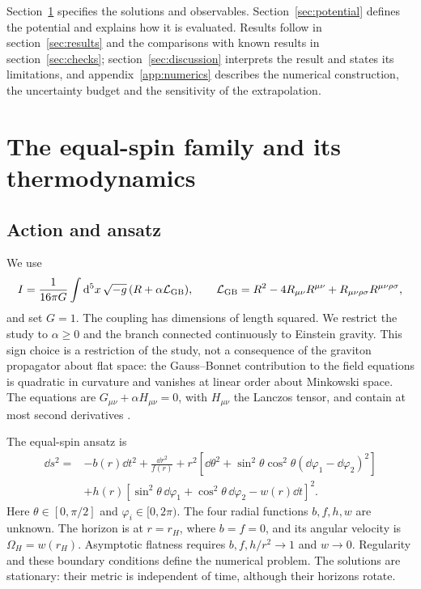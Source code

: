 \documentclass[11pt,a4paper]{article}
\begin{document}
Section~\ref{sec:setup} specifies the solutions and observables.
Section~\ref{sec:potential} defines the potential and explains how it is
evaluated. Results follow in section~\ref{sec:results} and the comparisons with
known results in section~\ref{sec:checks}; section~\ref{sec:discussion}
interprets the result and states its limitations, and
appendix~\ref{app:numerics} describes the numerical construction, the
uncertainty budget and the sensitivity of the extrapolation.

\section{The equal-spin family and its thermodynamics}
\label{sec:setup}

\subsection{Action and ansatz}

We use
\begin{equation}
 I=\frac1{16\pi G}\int\mathrm{d}^5x\,\sqrt{-g}\,
 (R+\alpha\mathcal L_{\mathrm{GB}}),\qquad
 \mathcal L_{\mathrm{GB}}=R^2-4R_{\mu\nu}R^{\mu\nu}
                  +R_{\mu\nu\rho\sigma}R^{\mu\nu\rho\sigma},
 \label{eq:action}
\end{equation}
and set $G=1$. The coupling has dimensions of length squared.
We restrict the study to $\alpha\ge0$ and the branch connected continuously
to Einstein gravity. This sign choice is a restriction of the study, not
a consequence of the graviton propagator about flat space: the
Gauss--Bonnet contribution to the field equations is quadratic in curvature
and vanishes at linear order about Minkowski space.
The equations are $G_{\mu\nu}+\alpha H_{\mu\nu}=0$, with $H_{\mu\nu}$ the
Lanczos tensor, and contain at most second derivatives \cite{Lovelock:1971yv}.

The equal-spin ansatz \cite{Brihaye:2010wp} is
\begin{equation}
 \begin{aligned}
 \dd s^2={}&-b(r)\dd t^2+\frac{\dd r^2}{f(r)}
 +r^2[\dd\theta^2+\sin^2\theta\cos^2\theta
       (\dd\varphi_1-\dd\varphi_2)^2]\\
 &+h(r)[\sin^2\theta\,\dd\varphi_1+
         \cos^2\theta\,\dd\varphi_2-w(r)\dd t]^2 .
 \end{aligned}
 \label{eq:ansatz}
\end{equation}
Here $\theta\in[0,\pi/2]$ and $\varphi_i\in[0,2\pi)$.
The four radial functions $b,f,h,w$ are unknown. The horizon is at $r=r_H$,
where $b=f=0$, and its angular velocity is $\Omega_H=w(r_H)$.
Asymptotic flatness requires $b,f,h/r^2\to1$ and $w\to0$.
Regularity and these boundary conditions define the numerical problem.
The solutions are stationary: their metric is independent of time,
although their horizons rotate.
\end{document}
